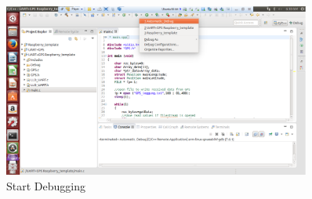 \begin{figure}[H]
	\centering\includegraphics[width=0.9\textwidth]{fig/Debug8}
	\caption{Start Debugging}
	\label{fig:Debug8}
\end{figure}


%







